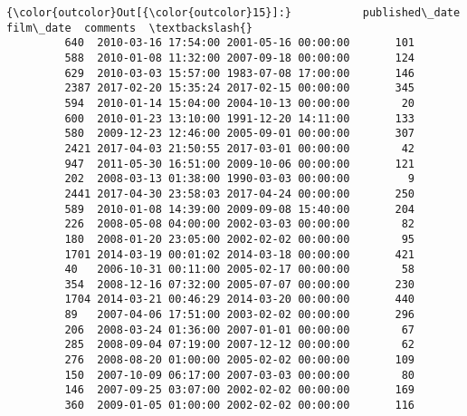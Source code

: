 \documentclass[11pt]{article}
\begin{document}
\begin{Verbatim}[commandchars=\\\{\}]
{\color{outcolor}Out[{\color{outcolor}15}]:}           published\_date           film\_date  comments  \textbackslash{}
         640  2010-03-16 17:54:00 2001-05-16 00:00:00       101   
         588  2010-01-08 11:32:00 2007-09-18 00:00:00       124   
         629  2010-03-03 15:57:00 1983-07-08 17:00:00       146   
         2387 2017-02-20 15:35:24 2017-02-15 00:00:00       345   
         594  2010-01-14 15:04:00 2004-10-13 00:00:00        20   
         600  2010-01-23 13:10:00 1991-12-20 14:11:00       133   
         580  2009-12-23 12:46:00 2005-09-01 00:00:00       307   
         2421 2017-04-03 21:50:55 2017-03-01 00:00:00        42   
         947  2011-05-30 16:51:00 2009-10-06 00:00:00       121   
         202  2008-03-13 01:38:00 1990-03-03 00:00:00         9   
         2441 2017-04-30 23:58:03 2017-04-24 00:00:00       250   
         589  2010-01-08 14:39:00 2009-09-08 15:40:00       204   
         226  2008-05-08 04:00:00 2002-03-03 00:00:00        82   
         180  2008-01-20 23:05:00 2002-02-02 00:00:00        95   
         1701 2014-03-19 00:01:02 2014-03-18 00:00:00       421   
         40   2006-10-31 00:11:00 2005-02-17 00:00:00        58   
         354  2008-12-16 07:32:00 2005-07-07 00:00:00       230   
         1704 2014-03-21 00:46:29 2014-03-20 00:00:00       440   
         89   2007-04-06 17:51:00 2003-02-02 00:00:00       296   
         206  2008-03-24 01:36:00 2007-01-01 00:00:00        67   
         285  2008-09-04 07:19:00 2007-12-12 00:00:00        62   
         276  2008-08-20 01:00:00 2005-02-02 00:00:00       109   
         150  2007-10-09 06:17:00 2007-03-03 00:00:00        80   
         146  2007-09-25 03:07:00 2002-02-02 00:00:00       169   
         360  2009-01-05 01:00:00 2002-02-02 00:00:00       116   
         

\end{Verbatim}
\end{document}
